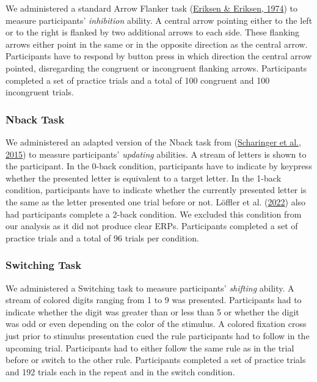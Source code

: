 \documentclass[
  man,floatsintext]{apa7}
\begin{document}
We administered a standard Arrow Flanker task (\protect\hyperlink{ref-eriksen1974effects}{Eriksen \& Eriksen, 1974}) to measure participants' \emph{inhibition} ability. A central arrow pointing either to the left or to the right is flanked by two additional arrows to each side. These flanking arrows either point in the same or in the opposite direction as the central arrow. Participants have to respond by button press in which direction the central arrow pointed, disregarding the congruent or incongruent flanking arrows. Participants completed a set of practice trials and a total of 100 congruent and 100 incongruent trials.

\hypertarget{nback-task}{%
\subsubsection{Nback Task}\label{nback-task}}

We administered an adapted version of the Nback task from (\protect\hyperlink{ref-scharinger2015flanker}{Scharinger et al., 2015}) to measure participants' \emph{updating} abilities. A stream of letters is shown to the participant. In the 0-back condition, participants have to indicate by keypress whether the presented letter is equivalent to a target letter. In the 1-back condition, participants have to indicate whether the currently presented letter is the same as the letter presented one trial before or not. Löffler et al. (\protect\hyperlink{ref-loffler2022common}{2022}) also had participants complete a 2-back condition. We excluded this condition from our analysis as it did not produce clear ERPs. Participants completed a set of practice trials and a total of 96 trials per condition.

\hypertarget{switching-task}{%
\subsubsection{Switching Task}\label{switching-task}}

We administered a Switching task to measure participants' \emph{shifting} ability. A stream of colored digits ranging from 1 to 9 was presented. Participants had to indicate whether the digit was greater than or less than 5 or whether the digit was odd or even depending on the color of the stimulus. A colored fixation cross just prior to stimulus presentation cued the rule participants had to follow in the upcoming trial. Participants had to either follow the same rule as in the trial before or switch to the other rule. Participants completed a set of practice trials and 192 trials each in the repeat and in the switch condition.
\end{document}
